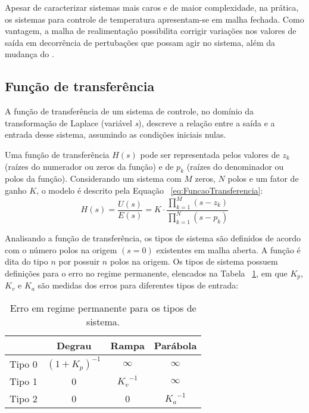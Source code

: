        Apesar de caracterizar sistemas mais caros e de maior complexidade, na prática, os sistemas para controle de temperatura apresentam-se em malha fechada. Como vantagem, a malha de realimentação possibilita corrigir variações nos valores de saída em decorrência de pertubações que possam agir no sistema, além da mudança do \SetPoint.
    \subsection{Função de transferência}
        A função de transferência de um sistema de controle, no domínio da transformação de Laplace (variável \textit{s}), descreve a relação entre a saída e a entrada desse sistema, assumindo as condições iniciais nulas. 
        
        Uma função de transferência $H(s)$ pode ser representada pelos valores de $z_k$ (raízes do numerador ou zeros da função) e de $p_k$ (raízes do denominador ou polos da função). Considerando um sistema com $M$ zeros, $N$ polos e um fator de ganho $K$, o modelo é descrito pela Equação ~\ref{eq:FuncaoTransferencia}:
        \begin{equation}
            \label{eq:FuncaoTransferencia}
            H(s) = \dfrac{U(s)}{E(s)}= K \cdot \dfrac{\prod_{k = 1}^{M}(s - z_k)}{\prod_{k = 1}^{N}(s - p_k)}
        \end{equation}
        
        Analisando a função de transferência, os tipos de sistema são definidos de acordo com o número polos na origem $(s=0)$ existentes em malha aberta. A função é dita do tipo $n$ por possuir $n$ polos na origem. Os tipos de sistema possuem definições para o erro no regime permanente, elencados na Tabela ~\ref{tab:TabelaErros}, em que $K_p$, $K_v$ e $K_a$ são medidas dos erros para diferentes tipos de entrada:
        
        \begin{table}[H]
            \caption{Erro em regime permanente para os tipos de sistema.} \label{tab:TabelaErros}
            \centering
            \begin{tabular}{cccc} \cline{2-4}
                \rule{0mm}{3mm} & Degrau & Rampa & Parábola \\ \hline \vspace{0.1cm}
                \rule{0mm}{5mm} Tipo 0 & ${(1+K_p)}^{-1}$ & $\infty$  & $\infty$ \\ \hline \vspace{0.1cm}
                \rule{0mm}{5mm} Tipo 1 & 0 & ${K_v}^{-1}$ & $\infty$ \\ \hline \vspace{0.1cm}
                \rule{0mm}{5mm} Tipo 2 & 0 & 0 & ${K_a}^{-1}$ \\ \hline
            \end{tabular}
        \end{table}
        
